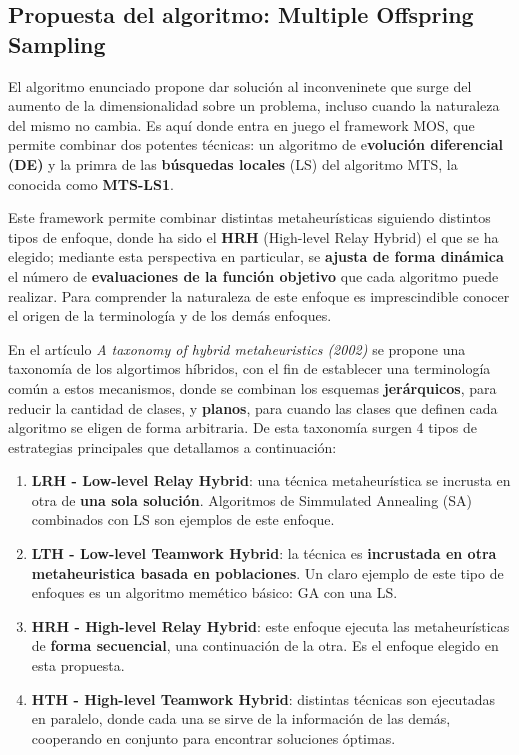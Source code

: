 \subsection{Propuesta del algoritmo: Multiple Offspring Sampling}

El algoritmo enunciado propone dar solución al inconveninete que surge del aumento de la dimensionalidad sobre un problema, incluso cuando la naturaleza del mismo no cambia. Es aquí donde entra en juego el framework MOS, que permite combinar dos potentes técnicas: un algoritmo de e\textbf{volución diferencial (DE)} y la primra de las \textbf{búsquedas locales} (LS) del algoritmo MTS, la conocida como \textbf{MTS-LS1}\cite{MTS-LSGO}.

Este framework permite combinar distintas metaheurísticas siguiendo distintos tipos de enfoque, donde ha sido el \textbf{HRH} (High-level Relay Hybrid) el que se ha elegido; mediante esta perspectiva en particular, se \textbf{ajusta de forma dinámica} el número de \textbf{evaluaciones de la función objetivo} que cada algoritmo puede realizar. Para comprender la naturaleza de este enfoque es imprescindible conocer el origen de la terminología y de los demás enfoques.

En el artículo \textit{A taxonomy of hybrid metaheuristics (2002)}\cite{TaxonomyEAs} se propone una taxonomía de los algortimos híbridos, con el fin de establecer una terminología común a estos mecanismos, donde se combinan los esquemas \textbf{jerárquicos}, para reducir la cantidad de clases, y \textbf{planos}, para cuando las clases que definen cada algoritmo se eligen de forma arbitraria. De esta taxonomía surgen 4 tipos de estrategias principales que detallamos a continuación:

\begin{enumerate}
	\item \textbf{LRH - Low-level Relay Hybrid}: una técnica metaheurística se incrusta en otra de \textbf{una sola solución}. Algoritmos de Simmulated Annealing (SA) combinados con LS son ejemplos de este enfoque.
	
	\item \textbf{LTH - Low-level Teamwork Hybrid}: la técnica es \textbf{incrustada en otra metaheuristica basada en poblaciones}. Un claro ejemplo de este tipo de enfoques es un algoritmo memético básico: GA con una LS.
	
	\item \textbf{HRH - High-level Relay Hybrid}: este enfoque ejecuta las metaheurísticas de \textbf{forma secuencial}, una continuación de la otra. Es el enfoque elegido en esta propuesta.
	
	\item \textbf{HTH - High-level Teamwork Hybrid}: distintas técnicas son ejecutadas en paralelo, donde cada una se sirve de la información de las demás, cooperando en conjunto para encontrar soluciones óptimas.
\end{enumerate}

